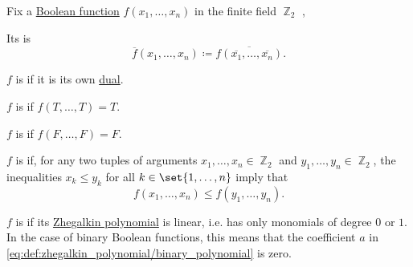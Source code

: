 \begin{definition}\label{def:boolean_functions_in_f2}
  Fix a \hyperref[def:boolean_function]{Boolean function} \( f(x_1, \ldots, x_n) \) in the finite field \hyperref[thm:f2_is_boolean_algebra]{\( \BbbZ_2 \)} ,

  \begin{thmenum}
     Its  is
    \begin{equation*}
      \overline{f}(x_1, \ldots, x_n) \coloneqq \overline{f(\overline{x_1}, \ldots, \overline{x_n})}.
    \end{equation*}

     \( f \) is  if it is its own \hyperref[def:boolean_function_in_f2/dual]{dual}.

     \( f \) is  if \( f(T, \ldots, T) = T \).

     \( f \) is  if \( f(F, \ldots, F) = F \).

     \( f \) is  if, for any two tuples of arguments \( x_1, \ldots, x_n \in \BbbZ_2 \) and \( y_1, \ldots, y_n \in \BbbZ_2 \), the inequalities \( x_k \leq y_k \) for all \( k \in \set{ 1, \ldots, n } \) imply that
    \begin{equation*}
      f(x_1, \ldots, x_n) \leq f(y_1, \ldots, y_n).
    \end{equation*}

     \( f \) is  if its \hyperref[def:zhegalkin_polynomial]{Zhegalkin polynomial} is linear, i.e. has only monomials of degree \( 0 \) or \( 1 \). In the case of binary Boolean functions, this means that the coefficient \( a \) in \eqref{eq:def:zhegalkin_polynomial/binary_polynomial} is zero.
  \end{thmenum}
\end{definition}

